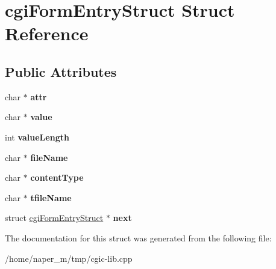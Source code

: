 \hypertarget{structcgi_form_entry_struct}{\section{cgi\-Form\-Entry\-Struct Struct Reference}
\label{structcgi_form_entry_struct}
}
\subsection*{Public Attributes}
\begin{DoxyCompactItemize}
\item 
\hypertarget{structcgi_form_entry_struct_a0e31404fb01e78b6bd5e1a77a4fbbff9}{char $\ast$ {\bfseries attr}}\label{structcgi_form_entry_struct_a0e31404fb01e78b6bd5e1a77a4fbbff9}

\item 
\hypertarget{structcgi_form_entry_struct_a69b386fa92a4e963ca26501db1c0b89f}{char $\ast$ {\bfseries value}}\label{structcgi_form_entry_struct_a69b386fa92a4e963ca26501db1c0b89f}

\item 
\hypertarget{structcgi_form_entry_struct_a5c8ff7ab479ee3962811c5df9e1b3f0b}{int {\bfseries value\-Length}}\label{structcgi_form_entry_struct_a5c8ff7ab479ee3962811c5df9e1b3f0b}

\item 
\hypertarget{structcgi_form_entry_struct_a570ed78b04d29ab828917ac32fa57fd5}{char $\ast$ {\bfseries file\-Name}}\label{structcgi_form_entry_struct_a570ed78b04d29ab828917ac32fa57fd5}

\item 
\hypertarget{structcgi_form_entry_struct_aef50fa661042cae39543d4dca417e860}{char $\ast$ {\bfseries content\-Type}}\label{structcgi_form_entry_struct_aef50fa661042cae39543d4dca417e860}

\item 
\hypertarget{structcgi_form_entry_struct_ab095781daad37f98a6e89817f74ed61a}{char $\ast$ {\bfseries tfile\-Name}}\label{structcgi_form_entry_struct_ab095781daad37f98a6e89817f74ed61a}

\item 
\hypertarget{structcgi_form_entry_struct_ad19b82767d663c6a21f85a59dea485b0}{struct \hyperlink{structcgi_form_entry_struct}{cgi\-Form\-Entry\-Struct} $\ast$ {\bfseries next}}\label{structcgi_form_entry_struct_ad19b82767d663c6a21f85a59dea485b0}

\end{DoxyCompactItemize}


The documentation for this struct was generated from the following file\-:\begin{DoxyCompactItemize}
\item 
/home/naper\-\_\-m/tmp/cgic-\/lib.\-cpp\end{DoxyCompactItemize}
